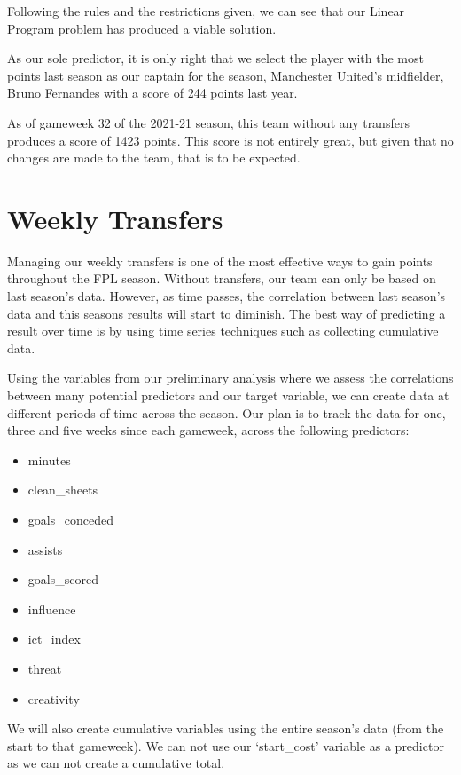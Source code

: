 \documentclass[12pt, a4paper, oneside]{book}
\numberwithin{equation}{section}
\begin{document}
Following the rules and the restrictions given, we can see that our Linear Program problem has produced a viable solution.

As our sole predictor, it is only right that we select the player with the most points last season as our captain for the season, Manchester United's midfielder, Bruno Fernandes with a score of 244 points last year.

As of gameweek 32 of the 2021-21 season, this team without any transfers produces a score of 1423 points. This score is not entirely great, but given that no changes are made to the team, that is to be expected.

\section{Weekly Transfers}\label{sec:5.2}

Managing our weekly transfers is one of the most effective ways to gain points throughout the FPL season. Without transfers, our team can only be based on last season's data. However, as time passes, the correlation between last season's data and this seasons results will start to diminish. The best way of predicting a result over time is by using time series techniques such as collecting cumulative data.

Using the variables from our \hyperref[total points current correlation]{preliminary analysis} where we assess the correlations between many potential predictors and our target variable, we can create data at different periods of time across the season. Our plan is to track the data for one, three and five weeks since each gameweek, across the following predictors:

\begin{itemize}
  \item minutes
  \item clean\_sheets
  \item goals\_conceded
  \item assists
  \item goals\_scored
  \item influence
  \item ict\_index
  \item threat
  \item creativity
\end{itemize}

We will also create cumulative variables using the entire season's data (from the start to that gameweek). We can not use our `start\_cost' variable as a predictor as we can not create a cumulative total.
\end{document}
